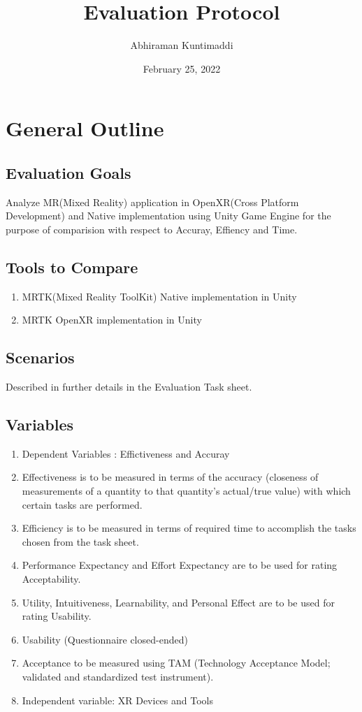 \documentclass{article}
\title{\textbf{Evaluation Protocol}}
\author{Abhiraman Kuntimaddi}
\date{February 25, 2022}
\begin{document}
\maketitle

\section{General Outline}

\subsection{Evaluation Goals}

Analyze MR(Mixed Reality) application in OpenXR(Cross Platform Development) and Native implementation using Unity Game Engine for the purpose of comparision with respect to Accuray, Effiency and Time.

\subsection{Tools to Compare}

\begin{enumerate}[label=\textbf{\alph*}]
  \item MRTK(Mixed Reality ToolKit) Native implementation in Unity
  \item MRTK OpenXR implementation in Unity
\end{enumerate}

\subsection{Scenarios}

Described in further details in the Evaluation Task sheet.

\subsection{Variables}

\begin{enumerate}[label=\textbf{\alph*}]
  \item Dependent Variables : Effictiveness and Accuray
  \item Effectiveness is to be measured in terms of the accuracy (closeness of measurements of a quantity to that quantity’s actual/true value) with which certain tasks are performed.
  \item Efficiency is to be measured in terms of required time to accomplish the tasks chosen from the task sheet.
  \item Performance Expectancy and Effort Expectancy are to be used for rating Acceptability.
  \item Utility, Intuitiveness, Learnability, and Personal Effect are to be used for rating Usability.
  \item Usability (Questionnaire closed-ended)
  \item Acceptance to be measured using TAM (Technology Acceptance Model; validated and standardized test instrument).
  \item Independent variable: XR Devices and Tools
\end{enumerate}
\end{document}
